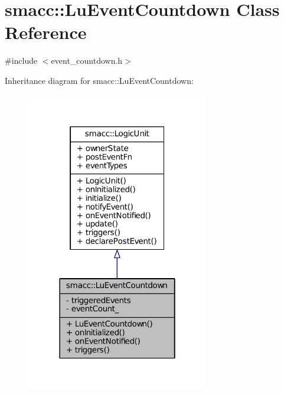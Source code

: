 \hypertarget{classsmacc_1_1LuEventCountdown}{}\section{smacc\+:\+:Lu\+Event\+Countdown Class Reference}
\label{classsmacc_1_1LuEventCountdown}


{\ttfamily \#include $<$event\+\_\+countdown.\+h$>$}



Inheritance diagram for smacc\+:\+:Lu\+Event\+Countdown\+:
\nopagebreak
\begin{figure}[H]
\begin{center}
\leavevmode
\includegraphics[width=226pt]{classsmacc_1_1LuEventCountdown__inherit__graph}
\end{center}
\end{figure}


